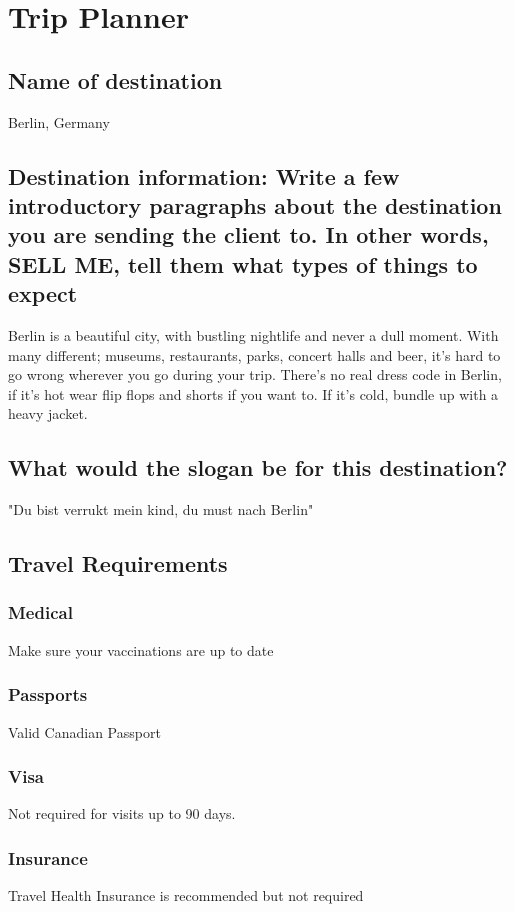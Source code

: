 \documentclass[11pt]{article}
\author{Kadin Buckton}
\date{\today}
\title{}
\begin{document}
\section*{Trip Planner}
\label{sec:orgeae97d9}
\subsection*{Name of destination}
\label{sec:org72d9ff3}
Berlin, Germany
\subsection*{Destination information: Write a few introductory paragraphs about the destination you are sending the client to. In other words, SELL ME, tell them what types of things to expect}
\label{sec:org3101553}
Berlin is a beautiful city, with bustling nightlife and never a dull moment. With many different; museums, restaurants, parks, concert halls and beer, it's hard to go wrong wherever you go during your trip. There's no real dress code in Berlin, if it's hot wear flip flops and shorts if you want to. If it's cold, bundle up with a heavy jacket. 
\subsection*{What would the slogan be for this destination?}
\label{sec:org7f6342d}
"Du bist verrukt mein kind, du must nach Berlin"
\subsection*{Travel Requirements}
\label{sec:org1f220a1}
\subsubsection*{Medical}
\label{sec:orge4f4503}
Make sure your vaccinations are up to date
\subsubsection*{Passports}
\label{sec:orgc5fe846}
Valid Canadian Passport
\subsubsection*{Visa}
\label{sec:org07eae7c}
Not required for visits up to 90 days. \cite{government}
\subsubsection*{Insurance}
\label{sec:orgcb01518}
Travel Health Insurance is recommended but not required
\end{document}
